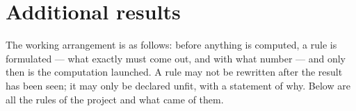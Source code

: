 \section{Additional results}\label{sec:supp}

The working arrangement is as follows: before anything is computed, a rule is formulated --- what exactly must come out, and with what number --- and only then is the computation launched. A rule may not be rewritten after the result has been seen; it may only be declared unfit, with a statement of why. Below are all the rules of the project and what came of them.

